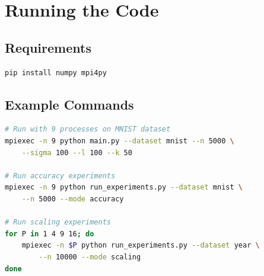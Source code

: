 \documentclass[11pt,a4paper]{article}
\begin{document}
\section{Running the Code}

\subsection{Requirements}

\begin{lstlisting}[language=bash]
pip install numpy mpi4py
\end{lstlisting}

\subsection{Example Commands}

\begin{lstlisting}[language=bash]
# Run with 9 processes on MNIST dataset
mpiexec -n 9 python main.py --dataset mnist --n 5000 \
    --sigma 100 --l 100 --k 50

# Run accuracy experiments
mpiexec -n 9 python run_experiments.py --dataset mnist \
    --n 5000 --mode accuracy

# Run scaling experiments
for P in 1 4 9 16; do
    mpiexec -n $P python run_experiments.py --dataset year \
        --n 10000 --mode scaling
done
\end{lstlisting}
\end{document}
